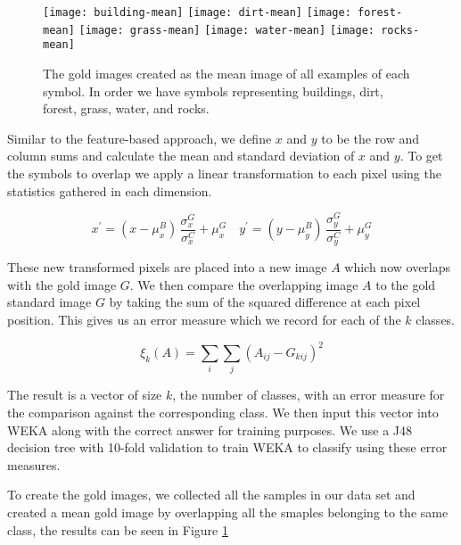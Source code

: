 
\begin{figure}[h]
\texttt{[image: building-mean]}
\texttt{[image: dirt-mean]}
\texttt{[image: forest-mean]}
\texttt{[image: grass-mean]}
\texttt{[image: water-mean]}
\texttt{[image: rocks-mean]}
\caption{The gold images created as the mean image of all examples of each symbol.
In order we have symbols representing buildings, dirt, forest, grass, water, and rocks.}
\label{figure:means}
\end{figure}

Similar to the feature-based approach, we define $x$ and $y$ to be the row and column sums
and calculate the mean and standard deviation of $x$ and $y$. To get the symbols to overlap we apply a
linear transformation to each pixel using the statistics gathered in each dimension.

\begin{equation} \label{eq:gold}
x^{\prime} = (x - \mu^{B}_{x}) \, \frac{\sigma^{G}_{x}}{\sigma^{C}_{x}} + \mu^{G}_{x} \quad
y^{\prime} = (y - \mu^{B}_{y}) \, \frac{\sigma^{G}_{y}}{\sigma^{C}_{y}} + \mu^{G}_{y}
\end{equation}

These new transformed pixels are placed into a new image $A$ which now overlaps with the
gold image $G$. We then compare the overlapping image $A$ to the gold standard image $G$ by taking the sum
of the squared difference at each pixel position. This gives us an error measure which we
record for each of the $k$ classes.

\[ \xi_{k}(A) = \sum_{i}\sum_{j}{(A_{ij} - G_{kij})^{2}} \]

The result is a vector of size $k$, the number of classes, with an error measure for the
comparison against the corresponding class. We then input this vector into WEKA along
with the correct answer for training purposes. We use a J48 decision tree with 10-fold
validation to train WEKA to classify using these error measures.

To create the gold images, we collected all the samples in our data set and 
created a mean gold image by overlapping all the smaples belonging to the same class,
the results can be seen in Figure \ref{figure:means}
